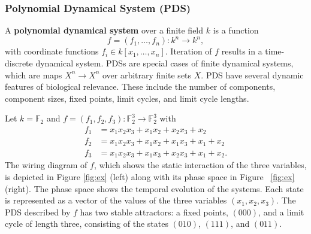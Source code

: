 \documentclass[11pt]{amsart}
\newenvironment{example}[1][Example]{\begin{trivlist}
\item[\hskip \labelsep {\bfseries #1}]}{\end{trivlist}}
\begin{document}
\subsubsection{Polynomial Dynamical System (PDS)}
A {\bf polynomial dynamical system} \cite{JLSS} over a finite field $k$ is a function
$$f = (f_1, \ldots, f_n) : k^n \rightarrow k^n,$$
with coordinate functions $f_i \in k[x_1, \ldots , x_n]$. Iteration of $f$ results
in a time-discrete dynamical system. PDSs are special cases of finite
dynamical systems, which are maps $X^n \rightarrow   X^n$ over arbitrary
finite sets $X$.
PDS have several dynamic features of biological
relevance. These include the number of components, component sizes, fixed
points, limit cycles, and limit cycle lengths.
\begin{example}
Let $k= \mathbb F_2$ and $f = (f_1, f_2, f_3) : \mathbb F_2^3 \rightarrow
\mathbb F_2^3$ with
\begin{align*}
f_1 &= x_1x_2x_3+x_1x_2+x_2x_3+x_2 \\
f_2 &= x_1x_2x_3+x_1x_2+x_1x_3+x_1+x_2 \\
f_3 &= x_1x_2x_3+x_1x_3+x_2x_3+x_1+x_2.
\end{align*}
The wiring diagram of $f$, which shows the static interaction of the three
variables, is
depicted in Figure \ref{fig:ex} (left) along with its phase space in Figure
~\ref{fig:ex} (right).
The phase space shows the temporal evolution of the systems. Each state is
represented as a vector of the values of the three variables $(x_1, x_2,
x_3)$.
The PDS described by $f$ has
two stable attractors: a fixed points, $(000)$, and a limit cycle of length
three, consisting of the states $(010)$, $(111)$, and $(011)$.
\end{example}
\end{document}
